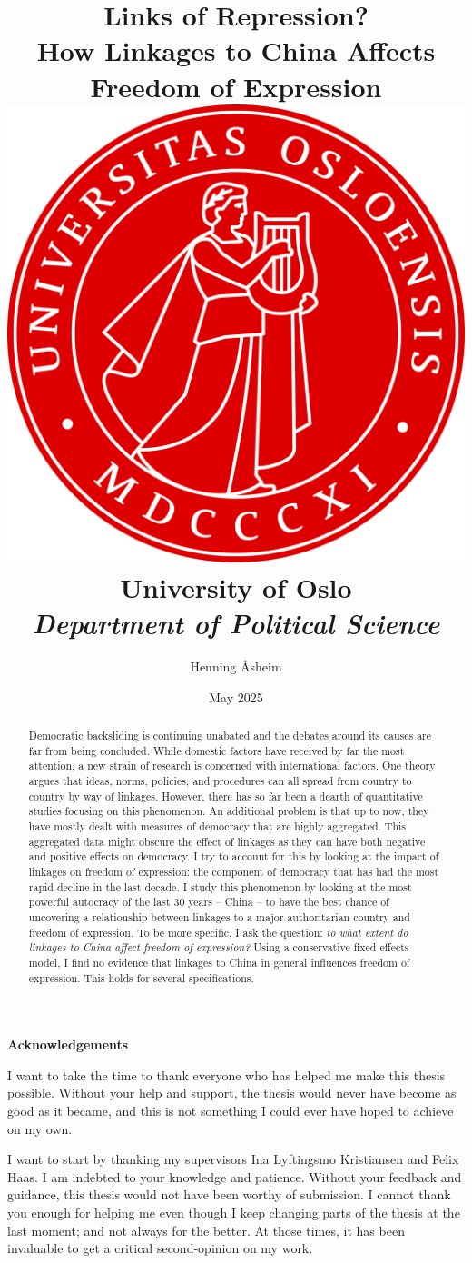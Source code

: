 \documentclass[12pt]{report} %
\title{
    {\textbf{Links of Repression?}}\\
    {\Large How Linkages to China Affects Freedom of Expression} \\
    \vspace{10mm}
    {\includegraphics[width = .6\textwidth]{graphics/uio_segl_roedt_liten_kant.png}} \\
    \vspace{10mm}
    {\large University of Oslo} \\
    {\small\textit{Department of Political Science}} \\
}
\author{Henning Åsheim}
\date{May 2025}
\begin{document}
\maketitle


\begin{abstract}
    Democratic backsliding is continuing unabated and the debates around its causes are far from being concluded. While domestic factors have received by far the most attention, a new strain of research is concerned with international factors. One theory argues that ideas, norms, policies, and procedures can all spread from country to country by way of linkages. However, there has so far been a dearth of quantitative studies focusing on this phenomenon. An additional problem is that up to now, they have mostly dealt with measures of democracy that are highly aggregated. This aggregated data might obscure the effect of linkages as they can have both negative and positive effects on democracy. I try to account for this by looking at the impact of linkages on freedom of expression: the component of democracy that has had the most rapid decline in the last decade. I study this phenomenon by looking at the most powerful autocracy of the last 30 years -- China -- to have the best chance of uncovering a relationship between linkages to a major authoritarian country and freedom of expression. To be more specific, I ask the question: \textit{to what extent do linkages to China affect freedom of expression?} Using a conservative fixed effects model, I find no evidence that linkages to China in general influences freedom of expression. This holds for several specifications.
\end{abstract}

\newpage

\begin{center}
    \large
    \textbf{Acknowledgements}
\end{center}
I want to take the time to thank everyone who has helped me make this thesis possible. Without your help and support, the thesis would never have become as good as it became, and this is not something I could ever have hoped to achieve on my own.

I want to start by thanking my supervisors Ina Lyftingsmo Kristiansen and Felix Haas. I am indebted to your knowledge and patience. Without your feedback and guidance, this thesis would not have been worthy of submission. I cannot thank you enough for helping me even though I keep changing parts of the thesis at the last moment; and not always for the better. At those times, it has been invaluable to get a critical second-opinion on my work.
\end{document}

